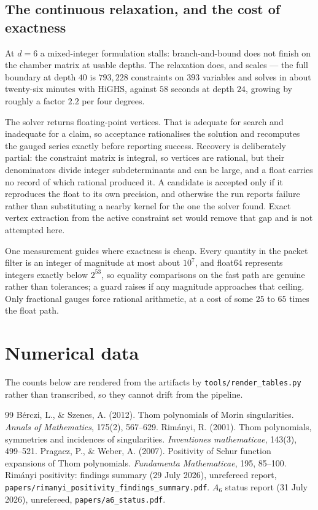 \documentclass[11pt,a4paper]{article}
\theoremstyle{plain}
\theoremstyle{definition}
\theoremstyle{remark}
\begin{document}
\subsection{The continuous relaxation, and the cost of exactness}
At $d = 6$ a mixed-integer formulation stalls: branch-and-bound does not finish on the chamber
matrix at usable depths. The relaxation does, and scales --- the full boundary at depth $40$ is
$793{,}228$ constraints on $393$ variables and solves in about twenty-six minutes with HiGHS,
against $58$ seconds at depth $24$, growing by roughly a factor $2.2$ per four degrees.

The solver returns floating-point vertices. That is adequate for search and inadequate for a
claim, so acceptance rationalises the solution and recomputes the gauged series exactly before
reporting success. Recovery is deliberately partial: the constraint matrix is integral, so
vertices are rational, but their denominators divide integer subdeterminants and can be large,
and a float carries no record of which rational produced it. A candidate is accepted only if it
reproduces the float to its own precision, and otherwise the run reports failure rather than
substituting a nearby kernel for the one the solver found. Exact vertex extraction from the
active constraint set would remove that gap and is not attempted here.

One measurement guides where exactness is cheap. Every quantity in the packet filter is an
integer of magnitude at most about $10^{7}$, and float64 represents integers exactly below
$2^{53}$, so equality comparisons on the fast path are genuine rather than tolerances; a guard
raises if any magnitude approaches that ceiling. Only fractional gauges force rational
arithmetic, at a cost of some $25$ to $65$ times the float path.

\section{Numerical data}
\label{app:data}

The counts below are rendered from the artifacts by \texttt{tools/render\_tables.py} rather than
transcribed, so they cannot drift from the pipeline.







\begin{thebibliography}{99}
 B\'erczi, L., \& Szenes, A. (2012). Thom polynomials of Morin singularities. \emph{Annals of Mathematics}, 175(2), 567--629.
 Rim\'anyi, R. (2001). Thom polynomials, symmetries and incidences of singularities. \emph{Inventiones mathematicae}, 143(3), 499--521.
 Pragacz, P., \& Weber, A. (2007). Positivity of Schur function expansions of Thom polynomials. \emph{Fundamenta Mathematicae}, 195, 85--100.
 Rim\'anyi positivity: findings summary (29 July 2026), unrefereed report, \texttt{papers/rimanyi\_positivity\_findings\_summary.pdf}.
 $A_6$ status report (31 July 2026), unrefereed, \texttt{papers/a6\_status.pdf}.
\end{thebibliography}
\end{document}
